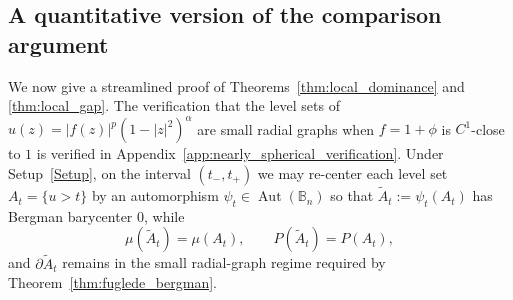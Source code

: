 \documentclass[11pt]{amsart}
\theoremstyle{plain}
\theoremstyle{definition}
\theoremstyle{remark}
\newcommand{\B}{\mathbb{B}}
\DeclareMathOperator{\Aut}{Aut}
\begin{document}
\subsection{A quantitative version of the comparison argument}\label{sec:quantitative_comparison_details}

We now give a streamlined proof of Theorems~\ref{thm:local_dominance} and
\ref{thm:local_gap}. The verification that the level sets of
\(
u(z)=|f(z)|^p(1-|z|^2)^\alpha
\)
are small radial graphs when \(f=1+\phi\) is \(C^1\)-close to \(1\) is
verified in Appendix~\ref{app:nearly_spherical_verification}. Under
Setup~\ref{Setup}, on the interval \((t_-,t_+)\) we may re-center each level set
\(
A_t=\{u>t\}
\)
by an automorphism \(\psi_t\in\Aut(\B_n)\) so that
\(
\widetilde A_t:=\psi_t(A_t)
\)
has Bergman barycenter \(0\), while
\[
\mu(\widetilde A_t)=\mu(A_t),\qquad P(\widetilde A_t)=P(A_t),
\]
and \(\partial \widetilde A_t\) remains in the small radial-graph regime required by
Theorem~\ref{thm:fuglede_bergman}.
\end{document}
